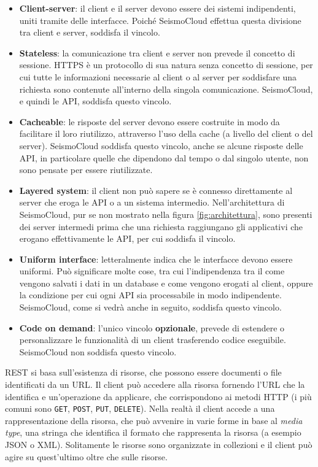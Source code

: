 \begin{itemize}
\item \textbf{Client-server}: il client e il server devono essere dei sistemi indipendenti, uniti tramite delle interfacce. Poiché SeismoCloud effettua questa divisione tra client e server, soddisfa il vincolo.
\item \textbf{Stateless}: la comunicazione tra client e server non prevede il concetto di sessione. HTTPS è un protocollo di sua natura senza concetto di sessione, per cui tutte le informazioni necessarie al client o al server per soddisfare una richiesta sono contenute all'interno della singola comunicazione. SeismoCloud, e quindi le API, soddisfa questo vincolo.
\item \textbf{Cacheable}: le risposte del server devono essere costruite in modo da facilitare il loro riutilizzo, attraverso l'uso della cache (a livello del client o del server). SeismoCloud soddisfa questo vincolo, anche se alcune risposte delle API, in particolare quelle che dipendono dal tempo o dal singolo utente, non sono pensate per essere riutilizzate.
\item \textbf{Layered system}: il client non può sapere se è connesso direttamente al server che eroga le API o a un sistema intermedio. Nell'architettura di SeismoCloud, pur se non mostrato nella figura \ref{fig:architettura}, sono presenti dei server intermedi prima che una richiesta raggiungano gli applicativi che erogano effettivamente le API, per cui soddisfa il vincolo.
\item \textbf{Uniform interface}: letteralmente indica che le interfacce devono essere uniformi. Può significare molte cose, tra cui l'indipendenza tra il come vengono salvati i dati in un database e come vengono erogati al client, oppure la condizione per cui ogni API sia processabile in modo indipendente. SeismoCloud, come si vedrà anche in seguito, soddisfa questo vincolo.
\item \textbf{Code on demand}: l'unico vincolo \textbf{opzionale}, prevede di estendere o personalizzare le funzionalità di un client trasferendo codice eseguibile. SeismoCloud non soddisfa questo vincolo.
\end{itemize}

REST si basa sull'esistenza di risorse, che possono essere documenti o file identificati da un URL. Il client può accedere alla risorsa fornendo l'URL che la identifica e un'operazione da applicare, che corrispondono ai metodi HTTP (i più comuni sono \texttt{GET}, \texttt{POST}, \texttt{PUT}, \texttt{DELETE}). Nella realtà il client accede a una rappresentazione della risorsa, che può avvenire in varie forme in base al \textit{media type}, una stringa che identifica il formato che rappresenta la risorsa (a esempio JSON o XML). Solitamente le risorse sono organizzate in collezioni e il client può agire su quest'ultimo oltre che sulle risorse.

